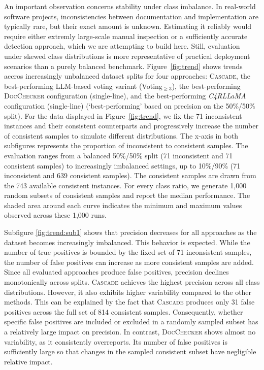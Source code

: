 \documentclass[acmsmall, screen]{acmart}
\newcommand{\tool}{\textsc{Cascade}\xspace}
\begin{document}
An important observation concerns stability under class imbalance. In real-world software projects, inconsistencies between documentation and implementation are typically rare, but their exact amount is unknown. Estimating it reliably would require either extremly  large-scale manual inspection or a sufficiently accurate detection approach, which we are attempting to build here. Still, evaluation under skewed class distributions is more representative of practical deployment scenarios than a purely balanced benchmark.
Figure~\ref{fig:trend} shows trends accros increasingly unbalanced dataset splits for four approaches: \tool, the best-performing LLM-based voting variant (Voting$_{\geq3}$), the best-performing \textsc{DocChecker} configuration (single-line), and the best-performing \textit{C4RLLaMA} configuration (single-line) (`best-performing' based on precision on the 50\%/50\% split). For the data displayed in Figure~\ref{fig:trend}, we fix the 71 inconsistent instances and their consistent counterparts and progressively increase the number of consistent samples to simulate different distributions.
The x-axis in both subfigures represents the proportion of inconsistent to consistent samples. The evaluation ranges from a balanced 50\%/50\% split (71 inconsistent and 71 consistent samples) to increasingly imbalanced settings, up to 10\%/90\% (71 inconsistent and 639 consistent samples).
The consistent samples are drawn from the 743 available consistent instances. For every class ratio, we generate 1,000 random subsets of consistent samples and report the median performance. The shaded area around each curve indicates the minimum and maximum values observed across these 1,000 runs.

Subfigure \ref{fig:trend:sub1} shows that precision decreases for all approaches as the dataset becomes increasingly imbalanced. This behavior is expected. While the number of true positives is bounded by the fixed set of 71 inconsistent samples, the number of false positives can increase as more consistent samples are added. Since all evaluated approaches produce false positives, precision declines monotonically across splits. \tool achieves the highest precision across all class distributions. However, it also exhibits higher variability compared to the other methods. This can be explained by the fact that \tool produces only 31 false positives across the full set of 814 consistent samples. Consequently, whether specific false positives are included or excluded in a randomly sampled subset has a relatively large impact on precision. In contrast, \textsc{DocChecker} shows almost no variability, as it consistently overreports. Its number of false positives is sufficiently large so that changes in the sampled consistent subset have negligible relative impact.
\end{document}
